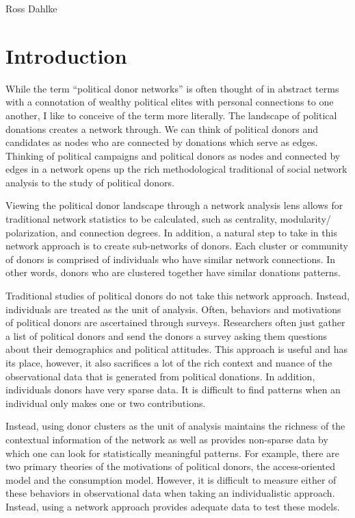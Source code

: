 \documentclass[12pt,]{article}
\author{\Large Ross Dahlke\vspace{0.05in} \newline\normalsize\emph{}  }
\date{}
\begin{document}
	
%




\vskip -8.5pt



\noindent \doublespacing 

Ross Dahlke

\hypertarget{introduction}{%
\section{Introduction}\label{introduction}}

While the term ``political donor networks'' is often thought of in
abstract terms with a connotation of wealthy political elites with
personal connections to one another, I like to conceive of the term more
literally. The landscape of political donations creates a network
through. We can think of political donors and candidates as nodes who
are connected by donations which serve as edges. Thinking of political
campaigns and political donors as nodes and connected by edges in a
network opens up the rich methodological traditional of social network
analysis to the study of political donors.

Viewing the political donor landscape through a network analysis lens
allows for traditional network statistics to be calculated, such as
centrality, modularity/ polarization, and connection degrees. In
addition, a natural step to take in this network approach is to create
sub-networks of donors. Each cluster or community of donors is comprised
of individuals who have similar network connections. In other words,
donors who are clustered together have similar donations patterns.

Traditional studies of political donors do not take this network
approach. Instead, individuals are treated as the unit of analysis.
Often, behaviors and motivations of political donors are ascertained
through surveys. Researchers often just gather a list of political
donors and send the donors a survey asking them questions about their
demographics and political attitudes. This approach is useful and has
its place, however, it also sacrifices a lot of the rich context and
nuance of the observational data that is generated from political
donations. In addition, individuals donors have very sparse data. It is
difficult to find patterns when an individual only makes one or two
contributions.

Instead, using donor clusters as the unit of analysis maintains the
richness of the contextual information of the network as well as
provides non-sparse data by which one can look for statistically
meaningful patterns. For example, there are two primary theories of the
motivations of political donors, the access-oriented model and the
consumption model. However, it is difficult to measure either of these
behaviors in observational data when taking an individualistic approach.
Instead, using a network approach provides adequate data to test these
models.
\end{document}
